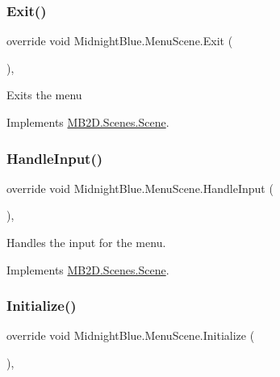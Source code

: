 \subsubsection{\texorpdfstring{Exit()}{Exit()}}
{\footnotesize\ttfamily override void Midnight\+Blue.\+Menu\+Scene.\+Exit (\begin{DoxyParamCaption}{ }\end{DoxyParamCaption})\hspace{0.3cm}{\ttfamily [inline]}, {\ttfamily [virtual]}}



Exits the menu 



Implements \hyperlink{class_m_b2_d_1_1_scenes_1_1_scene_a099b79e16d23b67349847999d2336813}{M\+B2\+D.\+Scenes.\+Scene}.

\hypertarget{class_midnight_blue_1_1_menu_scene_a34d30a2b66e9eadbf0889071bca6fa57}{}\label{class_midnight_blue_1_1_menu_scene_a34d30a2b66e9eadbf0889071bca6fa57} 
\subsubsection{\texorpdfstring{Handle\+Input()}{HandleInput()}}
{\footnotesize\ttfamily override void Midnight\+Blue.\+Menu\+Scene.\+Handle\+Input (\begin{DoxyParamCaption}{ }\end{DoxyParamCaption})\hspace{0.3cm}{\ttfamily [inline]}, {\ttfamily [virtual]}}



Handles the input for the menu. 



Implements \hyperlink{class_m_b2_d_1_1_scenes_1_1_scene_a476de5a885408d27ff151044d20738c8}{M\+B2\+D.\+Scenes.\+Scene}.

\hypertarget{class_midnight_blue_1_1_menu_scene_ab46d90617acf2fad0a3c759337c54aaf}{}\label{class_midnight_blue_1_1_menu_scene_ab46d90617acf2fad0a3c759337c54aaf} 
\subsubsection{\texorpdfstring{Initialize()}{Initialize()}}
{\footnotesize\ttfamily override void Midnight\+Blue.\+Menu\+Scene.\+Initialize (\begin{DoxyParamCaption}{ }\end{DoxyParamCaption})\hspace{0.3cm}{\ttfamily [inline]}, {\ttfamily [virtual]}}



